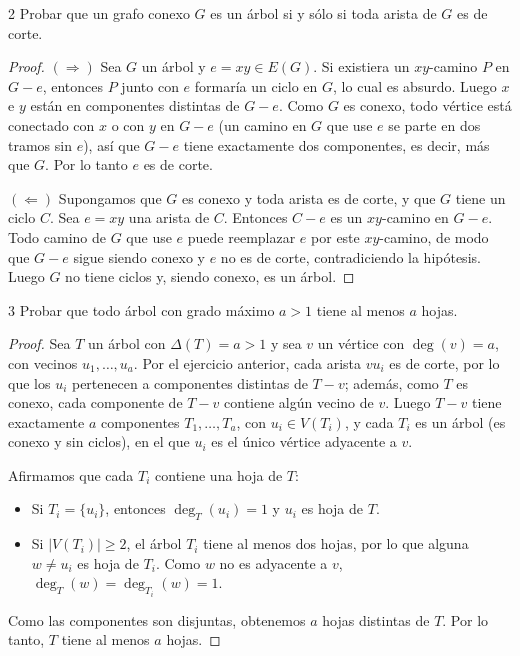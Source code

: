\begin{ejercicio}{2}
    Probar que un grafo conexo \( G \) es un árbol si y sólo si toda arista de \( G \) es de corte.
\end{ejercicio}
\begin{proof}
    \( (\Rightarrow) \) Sea \( G \) un árbol y \( e = xy \in E(G) \). Si existiera un \( xy \)-camino \( P \) en \( G - e \), entonces \( P \) junto con \( e \) formaría un ciclo en \( G \), lo cual es absurdo. Luego \( x \) e \( y \) están en componentes distintas de \( G - e \). Como \( G \) es conexo, todo vértice está conectado con \( x \) o con \( y \) en \( G - e \) (un camino en \( G \) que use \( e \) se parte en dos tramos sin \( e \)), así que \( G - e \) tiene exactamente dos componentes, es decir, más que \( G \). Por lo tanto \( e \) es de corte.

    \( (\Leftarrow) \) Supongamos que \( G \) es conexo y toda arista es de corte, y que \( G \) tiene un ciclo \( C \). Sea \( e = xy \) una arista de \( C \). Entonces \( C - e \) es un \( xy \)-camino en \( G - e \). Todo camino de \( G \) que use \( e \) puede reemplazar \( e \) por este \( xy \)-camino, de modo que \( G - e \) sigue siendo conexo y \( e \) no es de corte, contradiciendo la hipótesis. Luego \( G \) no tiene ciclos y, siendo conexo, es un árbol.
\end{proof}

\vspace{0.5cm}

\begin{ejercicio}{3}
    Probar que todo árbol con grado máximo \( a > 1 \) tiene al menos \( a \) hojas.
\end{ejercicio}
\begin{proof}
    Sea \( T \) un árbol con \( \Delta(T) = a > 1 \) y sea \( v \) un vértice con \( \deg(v) = a \), con vecinos \( u_1, \ldots, u_a \). Por el ejercicio anterior, cada arista \( vu_i \) es de corte, por lo que los \( u_i \) pertenecen a componentes distintas de \( T - v \); además, como \( T \) es conexo, cada componente de \( T - v \) contiene algún vecino de \( v \). Luego \( T - v \) tiene exactamente \( a \) componentes \( T_1, \ldots, T_a \), con \( u_i \in V(T_i) \), y cada \( T_i \) es un árbol (es conexo y sin ciclos), en el que \( u_i \) es el único vértice adyacente a \( v \).

    Afirmamos que cada \( T_i \) contiene una hoja de \( T \):
    \begin{itemize}
        \item Si \( T_i = \{u_i\} \), entonces \( \deg_T(u_i) = 1 \) y \( u_i \) es hoja de \( T \).
        \item Si \( |V(T_i)| \geq 2 \), el árbol \( T_i \) tiene al menos dos hojas, por lo que alguna \( w \neq u_i \) es hoja de \( T_i \). Como \( w \) no es adyacente a \( v \), \( \deg_T(w) = \deg_{T_i}(w) = 1 \).
    \end{itemize}
    Como las componentes son disjuntas, obtenemos \( a \) hojas distintas de \( T \). Por lo tanto, \( T \) tiene al menos \( a \) hojas.
\end{proof}

